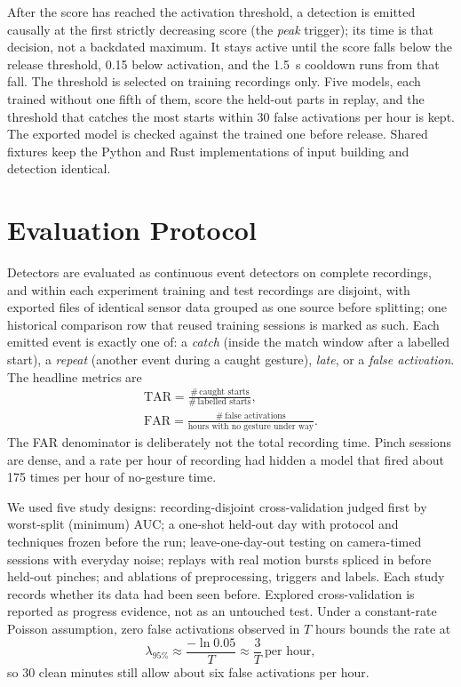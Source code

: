 After the score has reached the activation threshold, a detection is emitted causally at the first strictly decreasing score (the \emph{peak} trigger); its time is that decision, not a backdated maximum. It stays active until the score falls below the release threshold, 0.15 below activation, and the 1.5~s cooldown runs from that fall. The threshold is selected on training recordings only. Five models, each trained without one fifth of them, score the held-out parts in replay, and the threshold that catches the most starts within 30 false activations per hour is kept. The exported model is checked against the trained one before release. Shared fixtures keep the Python and Rust implementations of input building and detection identical.

\section{Evaluation Protocol}\label{sec:protocol}

Detectors are evaluated as continuous event detectors on complete recordings, and within each experiment training and test recordings are disjoint, with exported files of identical sensor data grouped as one source before splitting; one historical comparison row that reused training sessions is marked as such. Each emitted event is exactly one of: a \emph{catch} (inside the match window after a labelled start), a \emph{repeat} (another event during a caught gesture), \emph{late}, or a \emph{false activation}. The headline metrics are
\begin{gather}
  \mathrm{TAR} = \frac{\#\,\text{caught starts}}{\#\,\text{labelled starts}}, \label{eq:tar}\\
  \mathrm{FAR} = \frac{\#\,\text{false activations}}{\text{hours with no gesture under way}}. \label{eq:far}
\end{gather}
The FAR denominator is deliberately not the total recording time. Pinch sessions are dense, and a rate per hour of recording had hidden a model that fired about 175 times per hour of no-gesture time.

We used five study designs: recording-disjoint cross-validation judged first by worst-split (minimum) AUC; a one-shot held-out day with protocol and techniques frozen before the run; leave-one-day-out testing on camera-timed sessions with everyday noise; replays with real motion bursts spliced in before held-out pinches; and ablations of preprocessing, triggers and labels. Each study records whether its data had been seen before. Explored cross-validation is reported as progress evidence, not as an untouched test. Under a constant-rate Poisson assumption, zero false activations observed in $T$ hours bounds the rate at
\begin{equation}
  \lambda_{95\%} \approx \frac{-\ln 0.05}{T} \approx \frac{3}{T}\ \text{per hour},
  \label{eq:poisson}
\end{equation}
so 30 clean minutes still allow about six false activations per hour.

